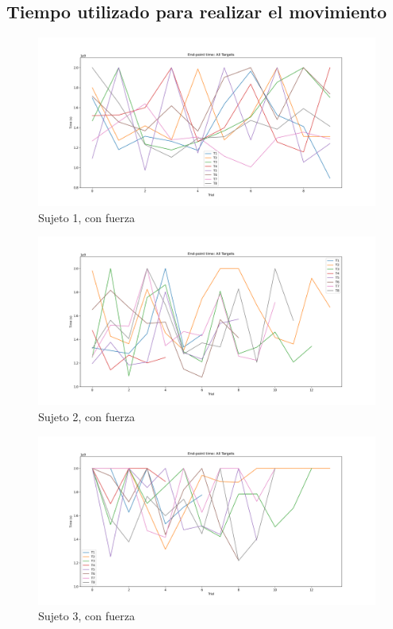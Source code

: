 \documentclass[a4paper,11pt, oneside]{book}
\begin{document}
\subsection{Tiempo utilizado para realizar el movimiento}
\label{anexo:4}
\begin{figure}[H]
	\includegraphics[width=\linewidth]{sujeto1/force/evolution_time}
	\caption{Sujeto 1, con fuerza}
	\label{1-2-3}
\end{figure}
\begin{figure}[H]
	\includegraphics[width=\linewidth]{sujeto2/force/evolution_time}
	\caption{Sujeto 2, con fuerza}
	\label{2-2-3}
\end{figure}
\begin{figure}[H]
	\includegraphics[width=\linewidth]{sujeto3/force/evolution_time}
	\caption{Sujeto 3, con fuerza}
	\label{3-2-3}
\end{figure}
\end{document}
